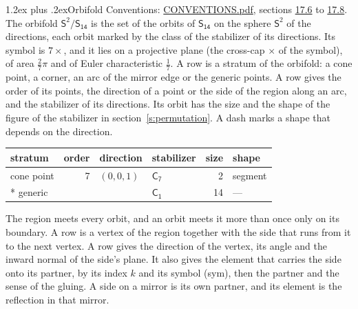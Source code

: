\documentclass[10pt,a4paper]{article}
\makeatletter
\renewcommand\section{\@startsection{section}{1}{\z@}{-3ex plus -1ex minus -.2ex}%
  {1.2ex plus .2ex}{\normalfont\large\sffamily\bfseries\color{parttitle}}}
\numberwithin{equation}{section}
\newcommand{\grp}[1]{\mathsf{#1}}
\newcommand{\orbname}[1]{#1}
\newcommand{\dirvec}[3]{(#1, #2, #3)}
\newcommand{\twosphere}{\mathsf{S}^{2}}
\makeatother
\begin{document}
\section{Orbifold}\label{s:orbifold}
Conventions: \href{../../CONVENTIONS.pdf}{CONVENTIONS.pdf}, sections \href{../../CONVENTIONS.pdf\#conv.17.6}{17.6} to \href{../../CONVENTIONS.pdf\#conv.17.8}{17.8}.
The orbifold $\twosphere/\grp{S_{14}}$ is the set of the orbits of $\grp{S_{14}}$ on the sphere $\twosphere$ of the directions, each orbit marked by the class of the stabilizer of its directions. Its symbol is $\orbname{7{\times}}$, and it lies on a projective plane (the cross-cap ${\times}$ of the symbol), of area $\tfrac{2}{7}\pi$ and of Euler characteristic $\tfrac{1}{7}$.
\leavevmode\label{n:head.stratum}\label{n:head.order.point}\label{n:head.direction}\label{n:head.stabilizer}\label{n:head.size.orbit}\label{n:head.shape}A row is a stratum of the orbifold: a cone point, a corner, an arc of the mirror edge or the generic points. A row gives the order of its points, the direction of a point or the side of the region along an arc, and the stabilizer of its directions. Its orbit has the size and the shape of the figure of the stabilizer in section~\ref{s:permutation}. A dash marks a shape that depends on the direction.
{\small\setlength{\tabcolsep}{4pt}\begin{longtable}{@{}lrllrl@{}}\toprule
stratum & order & direction & stabilizer & size & shape\\\midrule\endhead
\bottomrule\endfoot\endlastfoot
cone point & 7 & $\dirvec{0}{0}{1}$ & \href{C7.pdf}{$\grp{C_{7}}$} & 2 & segment\\*
generic &  &  & \href{C1.pdf}{$\grp{C_{1}}$} & 14 & ---\\
\bottomrule\end{longtable}}
\leavevmode\label{n:head.vertex.region}\label{n:head.angle}\label{n:head.normal.side}\label{n:head.partner}\label{n:head.sense}The region meets every orbit, and an orbit meets it more than once only on its boundary. A row is a vertex of the region together with the side that runs from it to the next vertex. A row gives the direction of the vertex, its angle and the inward normal of the side's plane. It also gives the element that carries the side onto its partner, by its index $k$ and its symbol (sym), then the partner and the sense of the gluing. A side on a mirror is its own partner, and its element is the reflection in that mirror.
\end{document}
